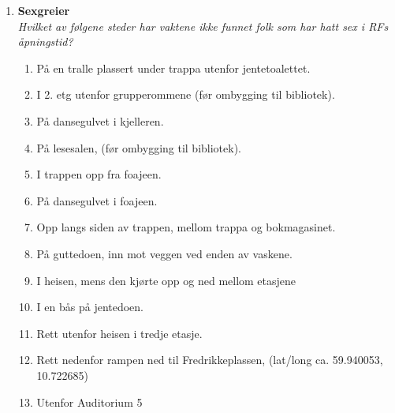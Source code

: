 \documentclass[11pt]{article}
\begin{document}
\begin{enumerate}
\item \textbf{Sexgreier} \vspace{1mm}\\
\textit{Hvilket av følgene steder har vaktene ikke funnet folk som har hatt sex i RFs åpningstid?}
   \begin{enumerate}
        \item På en tralle plassert under trappa utenfor jentetoalettet.
        \item I 2. etg utenfor grupperommene (før ombygging til bibliotek).
        \item På dansegulvet i kjelleren.
        \item På lesesalen, (før ombygging til bibliotek).
        \item I trappen opp fra foajeen.
        \item På dansegulvet i foajeen.
        \item Opp langs siden av trappen, mellom trappa og bokmagasinet.
        \item På guttedoen, inn mot veggen ved enden av vaskene.
        \item I heisen, mens den kjørte opp og ned mellom etasjene
        \item I en bås på jentedoen.
        \item Rett utenfor heisen i tredje etasje.
        \item Rett nedenfor rampen ned til Fredrikkeplassen, (lat/long ca. 59.940053, 10.722685)
        \item Utenfor Auditorium 5
    \end{enumerate}
  



\end{enumerate}
\end{document}
